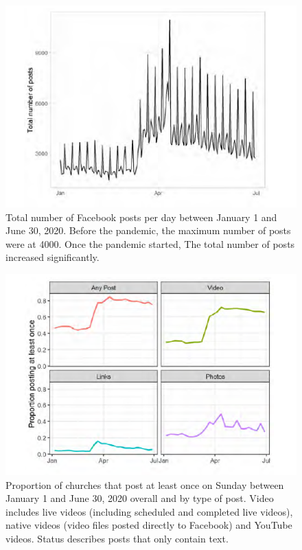\begin{figure}[t!]
\centering
\includegraphics[width=\columnwidth]{images/fig_1.PNG}
\caption{Total number of Facebook posts per day between January 1 and June 30, 2020. Before the pandemic, the maximum number of posts were at 4000. Once the pandemic started, The total number of posts increased significantly.}
\label{fig2}
\end{figure}

\begin{figure}[t!]
\centering
\includegraphics[width=\columnwidth]{images/fig_v3.PNG}
\caption{Proportion of churches that post at least once on Sunday between January 1 and June 30, 2020 overall and by type of post. Video includes live videos (including scheduled and completed live videos), native videos (video files posted directly to Facebook) and YouTube videos. Status describes posts that only contain text.}
\label{fig3}
\end{figure}

